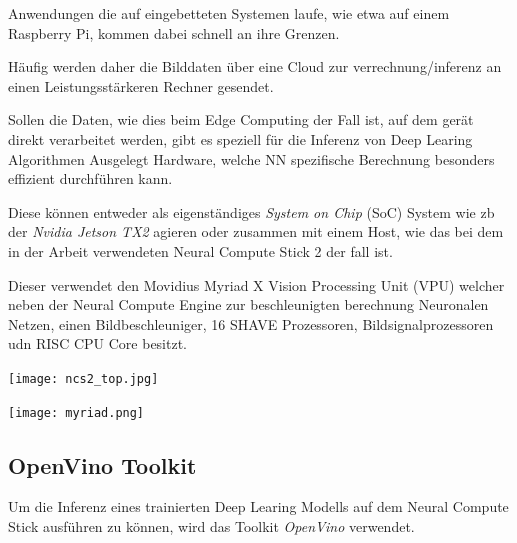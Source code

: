 Anwendungen die auf eingebetteten Systemen laufe, wie etwa 
auf einem Raspberry Pi, kommen dabei schnell an ihre 
Grenzen.

Häufig werden daher die Bilddaten über eine Cloud zur 
verrechnung/inferenz an einen Leistungsstärkeren 
Rechner gesendet.

Sollen die Daten, wie dies beim Edge Computing der Fall ist, 
auf dem gerät direkt verarbeitet werden, gibt es speziell 
für die Inferenz von Deep Learing Algorithmen Ausgelegt 
Hardware, welche NN spezifische Berechnung besonders 
effizient durchführen kann.

Diese können entweder als eigenständiges \textit{System on Chip}
(SoC) System wie zb der \textit{Nvidia Jetson TX2} agieren oder 
zusammen mit einem Host, wie das bei dem in der Arbeit verwendeten 
Neural Compute Stick 2 der fall ist.

Dieser verwendet den Movidius Myriad X Vision Processing Unit (VPU)
welcher neben der Neural Compute Engine zur beschleunigten berechnung 
Neuronalen Netzen, einen Bildbeschleuniger, 16 SHAVE Prozessoren, 
Bildsignalprozessoren udn RISC CPU Core besitzt.
\cite{haussermannFunktionUndEffizienz}
\\[1cm]
\begin{minipage}{0.4\textwidth}
    \centering
    \label{fig:ncs2}
    \texttt{[image: ncs2\_top.jpg]}
\end{minipage}
\begin{minipage}{0.6\textwidth}
    \centering
    \label{fig:myriad}
    \texttt{[image: myriad.png]}
\end{minipage}


\subsection{OpenVino Toolkit}



Um die Inferenz eines trainierten Deep Learing Modells auf dem
Neural Compute Stick ausführen zu können, wird das Toolkit 
\textit{OpenVino} verwendet.

